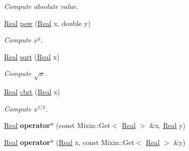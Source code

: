 \begin{DoxyCompactItemize}
\begin{DoxyCompactList}\small\item\em Compute absolute value. \end{DoxyCompactList}\item 
\hypertarget{namespaceSpacy_acffef7eb409609abe7ad87aaad28503f}{\hyperlink{classSpacy_1_1Real}{Real} \hyperlink{namespaceSpacy_acffef7eb409609abe7ad87aaad28503f}{pow} (\hyperlink{classSpacy_1_1Real}{Real} x, double y)}\label{namespaceSpacy_acffef7eb409609abe7ad87aaad28503f}

\begin{DoxyCompactList}\small\item\em Compute $x^y$. \end{DoxyCompactList}\item 
\hypertarget{namespaceSpacy_aa779bb3e2bf547cd0ed9ef47b3d711a3}{\hyperlink{classSpacy_1_1Real}{Real} \hyperlink{namespaceSpacy_aa779bb3e2bf547cd0ed9ef47b3d711a3}{sqrt} (\hyperlink{classSpacy_1_1Real}{Real} x)}\label{namespaceSpacy_aa779bb3e2bf547cd0ed9ef47b3d711a3}

\begin{DoxyCompactList}\small\item\em Compute $\sqrt{x}$. \end{DoxyCompactList}\item 
\hypertarget{namespaceSpacy_a64093cc47f73b71ba92bc0dd37e9572b}{\hyperlink{classSpacy_1_1Real}{Real} \hyperlink{namespaceSpacy_a64093cc47f73b71ba92bc0dd37e9572b}{cbrt} (\hyperlink{classSpacy_1_1Real}{Real} x)}\label{namespaceSpacy_a64093cc47f73b71ba92bc0dd37e9572b}

\begin{DoxyCompactList}\small\item\em Compute $ x^{1/3} $. \end{DoxyCompactList}\item 
\hypertarget{namespaceSpacy_a2408a53b27498ddeb762c52b51b71905}{\hyperlink{classSpacy_1_1Real}{Real} {\bfseries operator$\ast$} (const Mixin\-::\-Get$<$ \hyperlink{classSpacy_1_1Real}{Real} $>$ \&x, \hyperlink{classSpacy_1_1Real}{Real} y)}\label{namespaceSpacy_a2408a53b27498ddeb762c52b51b71905}

\item 
\hypertarget{namespaceSpacy_af0d849d3130fd1252cf3a58b4f194e6b}{\hyperlink{classSpacy_1_1Real}{Real} {\bfseries operator$\ast$} (\hyperlink{classSpacy_1_1Real}{Real} x, const Mixin\-::\-Get$<$ \hyperlink{classSpacy_1_1Real}{Real} $>$ \&y)}\label{namespaceSpacy_af0d849d3130fd1252cf3a58b4f194e6b}


\end{DoxyCompactItemize}

